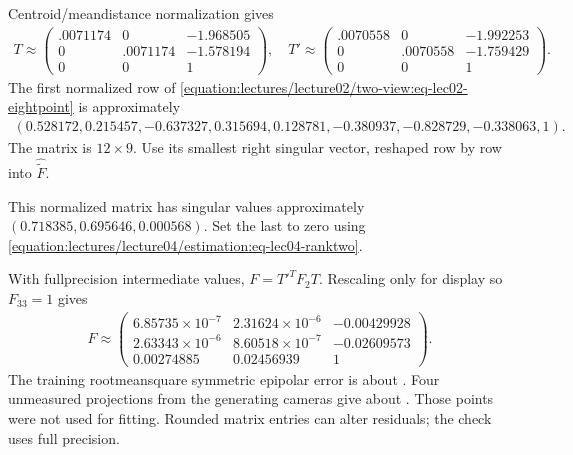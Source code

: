 \documentclass[letterpaper,11pt,english,openany,oneside]{jupyterBook}
\begin{document}
\begin{TextbookBox}
\sphinxAtStartPar
{} Centroid/mean\sphinxhyphen{}distance normalization gives
\begin{equation*}
\begin{split}
T\approx\begin{pmatrix}.0071174&0&-1.968505\\0&.0071174&-1.578194\\0&0&1\end{pmatrix},\quad
T'\approx\begin{pmatrix}.0070558&0&-1.992253\\0&.0070558&-1.759429\\0&0&1\end{pmatrix}.
\end{split}
\end{equation*}
\sphinxAtStartPar
{} The first normalized row of \eqref{equation:lectures/lecture02/two-view:eq-lec02-eightpoint} is approximately
\begin{equation*}
\begin{split}
(0.528172,0.215457,-0.637327,0.315694,0.128781,-0.380937,
-0.828729,-0.338063,1).
\end{split}
\end{equation*}
\sphinxAtStartPar
The matrix is \(12\times9\). Use its smallest right singular vector, reshaped row by row into \(\widehat{\widetilde F}\).

\sphinxAtStartPar
{} This normalized matrix has singular values approximately
\((0.718385,0.695646,0.000568)\). Set the last to zero using \eqref{equation:lectures/lecture04/estimation:eq-lec04-ranktwo}.

\sphinxAtStartPar
{} With full\sphinxhyphen{}precision intermediate values, \(F=T'^TF_2T\). Rescaling only for display so \(F_{33}=1\) gives
\begin{equation*}
\begin{split}
F\approx\begin{pmatrix}
6.85735\!\times\!10^{-7}&2.31624\!\times\!10^{-6}&-0.00429928\\
2.63343\!\times\!10^{-6}&8.60518\!\times\!10^{-7}&-0.02609573\\
0.00274885&0.02456939&1
\end{pmatrix}.
\end{split}
\end{equation*}
\sphinxAtStartPar
{} The training root\sphinxhyphen{}mean\sphinxhyphen{}square symmetric epipolar error is about . Four unmeasured projections from the generating cameras give about . Those points were not used for fitting. Rounded matrix entries can alter residuals; the check uses full precision.


\end{TextbookBox}
\end{document}

